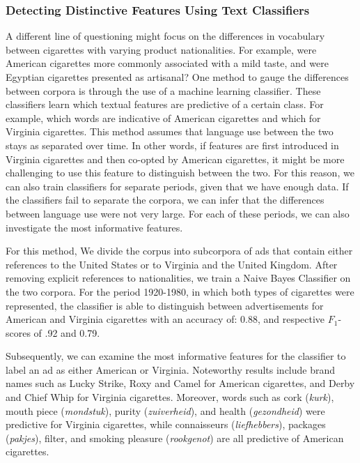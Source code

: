 \documentclass[USenglish]{article}
\begin{document}
\subsubsection{Detecting Distinctive Features Using Text Classifiers}
A different line of questioning might focus on the differences in vocabulary between cigarettes with varying product nationalities. For example, were American cigarettes more commonly associated with a mild taste, and were Egyptian cigarettes presented as artisanal? 
%
One method to gauge the differences between corpora is through the use of a machine learning classifier. These classifiers learn which textual features are predictive of a certain class. For example, which words are indicative of American cigarettes and which for Virginia cigarettes. This method assumes that language use between the two stays as separated over time. In other words, if features are first introduced in Virginia cigarettes and then co-opted by American cigarettes, it might be more challenging to use this feature to distinguish between the two. For this reason, we can also train classifiers for separate periods, given that we have enough data. If the classifiers fail to separate the corpora, we can infer that the differences between language use were not very large. For each of these periods, we can also investigate the most informative features. 

For this method, We divide the corpus into subcorpora of ads that contain either references to the United States or to Virginia and the United Kingdom. After removing explicit references to nationalities, we train a Naive Bayes Classifier on the two corpora. For the period 1920-1980, in which both types of cigarettes were represented, the classifier is able to distinguish between advertisements for American and Virginia cigarettes with an accuracy of: 0.88, and respective $F_{1}$-scores of .92 and 0.79.  

Subsequently, we can examine the most informative features for the classifier to label an ad as either American or Virginia. Noteworthy results include brand names such as Lucky Strike, Roxy and Camel for American cigarettes, and Derby and Chief Whip for Virginia cigarettes. Moreover, words such as cork (\textit{kurk}), mouth piece (\textit{mondstuk}), purity (\textit{zuiverheid}), and health (\textit{gezondheid}) were predictive for Virginia cigarettes, while connaisseurs (\textit{liefhebbers}), packages (\textit{pakjes}), filter, and smoking pleasure (\textit{rookgenot}) are all predictive of American cigarettes.
\end{document}
